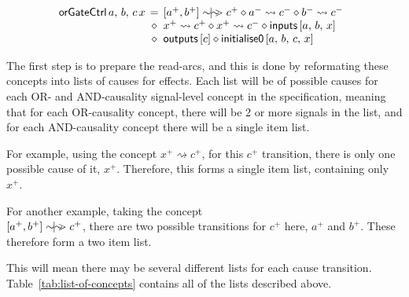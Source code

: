 \documentclass[british,conference,compsoc]{IEEEtran}
\begin{document}
\[
\begin{array}{lcl}
\hspace{-2mm}\mathsf{orGateCtrl}\,a,\,b,\,c\,x&\hspace{-2mm}=&\hspace{-2mm}[a^{+}, b^{+}]\sim\hspace{-1.5mm}|\hspace{-1.5mm}\sim\hspace{-1.5mm}>c^{+} 
\diamond a^{-}\rightsquigarrow c^{-} \diamond b^{-}\rightsquigarrow c^{-}\\
~&\hspace{-2mm}\diamond&\hspace{-2mm}x^{+}\rightsquigarrow c^{+} \diamond
x^{+}\rightsquigarrow c^{-} \diamond \mathsf{inputs} \, [a,\,b,\,x] \\
~&\hspace{-2mm}\diamond&\hspace{-2mm}\mathsf{outputs}\,[c]\diamond\mathsf{initialise0}\,[a,\,b,\,c,\,x]
\end{array}
\]

\noindent The first step is to prepare the read-arcs, and this is done by
reformating these concepts into lists of causes for effects.
Each list will be of possible causes for each OR- and AND-causality signal-level
concept in the specification, meaning that for each OR-causality concept, there will
be 2 or more signals in the list, and for each AND-causality concept there will be a single
item list. 

For example, using the concept $x^{+} \rightsquigarrow c^{+}$, for this $c^{+}$ transition,
there is only one possible cause of it, $x^{+}$. Therefore, this forms a single item list, 
containing only $x^{+}$.

For another example, taking the concept\\$[a^{+}, b^{+}]\sim\hspace{-1.5mm}|\hspace{-1.5mm}\sim\hspace{-1.5mm}>c^{+}$, there are
two possible transitions for $c^{+}$ here, $a^{+}$ and $b^{+}$. These therefore form 
a two item list. 

This will mean there may be several different lists for each cause transition. 
Table~\ref{tab:list-of-concepts} contains all of the lists described above.
\end{document}

